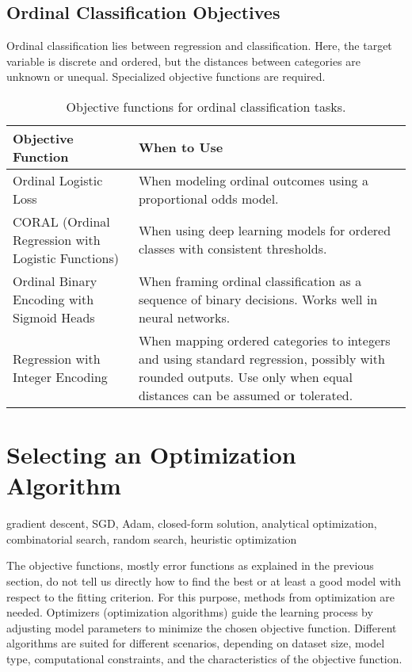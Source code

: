 \documentclass[12pt,openany, draft]{book}
\begin{document}
\subsection{Ordinal Classification Objectives}

Ordinal classification lies between regression and classification. 
Here, the target variable is discrete and ordered, but the distances 
between categories are unknown or unequal. Specialized objective 
functions are required.

\begin{table}[H]
    \centering
    \small
    \renewcommand{\arraystretch}{1.3}
    \begin{tabular}{|l|p{9cm}|}
        \hline
        \textbf{Objective Function} & \textbf{When to Use} \\
        \hline
        Ordinal Logistic Loss & When modeling ordinal outcomes using a proportional odds model. \\
        \hline
        CORAL (Ordinal Regression with Logistic Functions) & When using deep learning models for ordered classes with consistent thresholds. \\
        \hline
        Ordinal Binary Encoding with Sigmoid Heads & When framing ordinal classification as a sequence of binary decisions. Works well in neural networks. \\
        \hline
        Regression with Integer Encoding & When mapping ordered categories to integers and using standard regression, possibly with rounded outputs. Use only when equal distances can be assumed or tolerated. \\
        \hline
    \end{tabular}
    \caption{Objective functions for ordinal classification tasks.}
\end{table}



\section{Selecting an Optimization Algorithm}

\begin{keywordsbox}
gradient descent, SGD, Adam, closed-form solution, analytical optimization, combinatorial search, random search, heuristic optimization
\end{keywordsbox}

The objective functions, mostly error functions as explained in the previous section, do not tell us directly how to find the best or at least a good model with respect to the fitting criterion. For this purpose, methods from optimization are needed. Optimizers (optimization algorithms) guide the learning process by adjusting model parameters to minimize the chosen objective function. Different algorithms are suited for different scenarios, depending on dataset size, model type, computational constraints, and the characteristics of the objective function.
\newline
\end{document}
